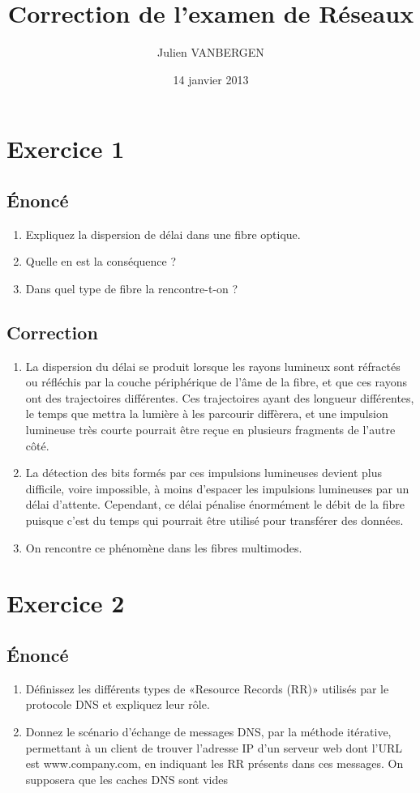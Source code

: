 \documentclass[a4paper, 11pt, titlepage]{article}
\title{Correction de l'examen de Réseaux}
\date{14 janvier 2013}
\author{Julien VANBERGEN}
\begin{document}
\maketitle

\section{Exercice 1}
\subsection{\'Enoncé}
\begin{enumerate}[label=(\alph*)]
  \item Expliquez la dispersion de délai dans une fibre optique.
  \item Quelle en est la conséquence ?
  \item Dans quel type de fibre la rencontre-t-on ?
\end{enumerate}

\subsection{Correction}
\begin{enumerate}[label=(\alph*)]
  \item La dispersion du délai se produit lorsque les rayons lumineux sont réfractés ou réfléchis par la couche périphérique de l'âme de la fibre, et que ces rayons ont des trajectoires différentes. Ces trajectoires ayant des longueur différentes, le temps que mettra la lumière à les parcourir diffèrera, et une impulsion lumineuse très courte pourrait être reçue en plusieurs fragments de l'autre côté.
  \item La détection des bits formés par ces impulsions lumineuses devient plus difficile, voire impossible, à moins d'espacer les impulsions lumineuses par un délai d'attente. Cependant, ce délai pénalise énormément le débit de la fibre puisque c'est du temps qui pourrait être utilisé pour transférer des données.
  \item On rencontre ce phénomène dans les fibres multimodes.
\end{enumerate}



\section{Exercice 2}
\subsection{\'Enoncé}
\begin{enumerate}[label=(\alph*)]
\item Définissez les différents types de «Resource Records (RR)» utilisés par le protocole DNS et expliquez leur rôle.
\item Donnez le scénario d’échange de messages DNS, par la méthode itérative, permettant à un client de trouver l’adresse IP d’un serveur web dont l’URL est www.company.com, en indiquant les RR présents dans ces messages. On supposera que les caches DNS sont vides
\end{enumerate}
\end{document}
